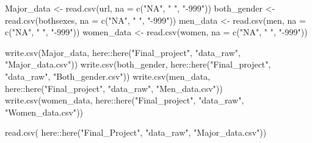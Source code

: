 \documentclass[
]{article}
\newenvironment{Shaded}{\begin{snugshade}}{\end{snugshade}}
\newcommand{\AttributeTok}[1]{\textcolor[rgb]{0.77,0.63,0.00}{#1}}
\newcommand{\FunctionTok}[1]{\textcolor[rgb]{0.00,0.00,0.00}{#1}}
\newcommand{\NormalTok}[1]{#1}
\newcommand{\OtherTok}[1]{\textcolor[rgb]{0.56,0.35,0.01}{#1}}
\newcommand{\SpecialCharTok}[1]{\textcolor[rgb]{0.00,0.00,0.00}{#1}}
\newcommand{\StringTok}[1]{\textcolor[rgb]{0.31,0.60,0.02}{#1}}
\begin{document}
\begin{Shaded}
\begin{Highlighting}[]
\NormalTok{Major\_data }\OtherTok{\textless{}{-}} \FunctionTok{read.csv}\NormalTok{(url,}
                       \AttributeTok{na =} \FunctionTok{c}\NormalTok{(}\StringTok{"NA"}\NormalTok{, }\StringTok{" "}\NormalTok{, }\StringTok{"{-}999"}\NormalTok{))}
\NormalTok{both\_gender }\OtherTok{\textless{}{-}}  \FunctionTok{read.csv}\NormalTok{(bothsexes,}
                       \AttributeTok{na =} \FunctionTok{c}\NormalTok{(}\StringTok{"NA"}\NormalTok{, }\StringTok{" "}\NormalTok{, }\StringTok{"{-}999"}\NormalTok{))}
\NormalTok{men\_data }\OtherTok{\textless{}{-}}  \FunctionTok{read.csv}\NormalTok{(men,}
                       \AttributeTok{na =} \FunctionTok{c}\NormalTok{(}\StringTok{"NA"}\NormalTok{, }\StringTok{" "}\NormalTok{, }\StringTok{"{-}999"}\NormalTok{))}
\NormalTok{women\_data }\OtherTok{\textless{}{-}}  \FunctionTok{read.csv}\NormalTok{(women,}
                       \AttributeTok{na =} \FunctionTok{c}\NormalTok{(}\StringTok{"NA"}\NormalTok{, }\StringTok{" "}\NormalTok{, }\StringTok{"{-}999"}\NormalTok{))}
\end{Highlighting}
\end{Shaded}

\begin{Shaded}
\begin{Highlighting}[]
\FunctionTok{write.csv}\NormalTok{(Major\_data,}
\NormalTok{          here}\SpecialCharTok{::}\FunctionTok{here}\NormalTok{(}\StringTok{"Final\_project"}\NormalTok{, }\StringTok{"data\_raw"}\NormalTok{, }\StringTok{"Major\_data.csv"}\NormalTok{))}
\FunctionTok{write.csv}\NormalTok{(both\_gender,}
\NormalTok{          here}\SpecialCharTok{::}\FunctionTok{here}\NormalTok{(}\StringTok{"Final\_project"}\NormalTok{, }\StringTok{"data\_raw"}\NormalTok{, }\StringTok{"Both\_gender.csv"}\NormalTok{))}
\FunctionTok{write.csv}\NormalTok{(men\_data,}
\NormalTok{          here}\SpecialCharTok{::}\FunctionTok{here}\NormalTok{(}\StringTok{"Final\_project"}\NormalTok{, }\StringTok{"data\_raw"}\NormalTok{, }\StringTok{"Men\_data.csv"}\NormalTok{))}
\FunctionTok{write.csv}\NormalTok{(women\_data,}
\NormalTok{          here}\SpecialCharTok{::}\FunctionTok{here}\NormalTok{(}\StringTok{"Final\_project"}\NormalTok{, }\StringTok{"data\_raw"}\NormalTok{, }\StringTok{"Women\_data.csv"}\NormalTok{))}
\end{Highlighting}
\end{Shaded}

\begin{Shaded}
\begin{Highlighting}[]
\FunctionTok{read.csv}\NormalTok{(}
\NormalTok{  here}\SpecialCharTok{::}\FunctionTok{here}\NormalTok{(}\StringTok{"Final\_Project"}\NormalTok{, }\StringTok{"data\_raw"}\NormalTok{, }\StringTok{"Major\_data.csv"}\NormalTok{))}
\end{Highlighting}
\end{Shaded}
\end{document}
